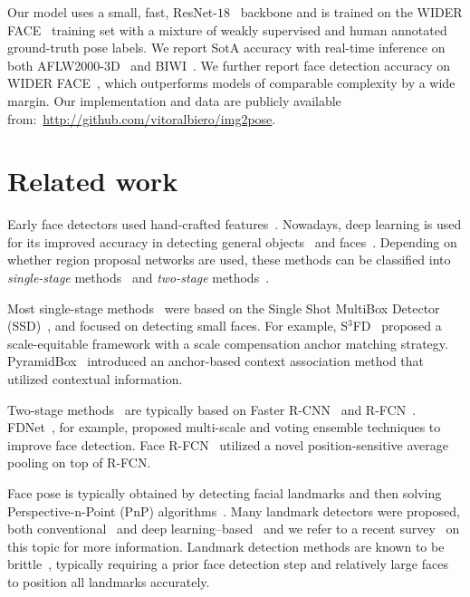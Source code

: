 \documentclass[final]{cvpr}
\newcommand{\minisection}[1]{\vspace{1mm}\noindent{\textbf{#1}.}}
\begin{document}
Our model uses a small, fast, ResNet-$18$~\cite{resnet} backbone and is trained on the WIDER FACE~\cite{wider_face} training set with a mixture of weakly supervised and human annotated ground-truth pose labels.  We report SotA accuracy with real-time inference on both AFLW2000-3D~\cite{3ddfa} and BIWI~\cite{biwi}. We further report face detection accuracy on WIDER FACE~\cite{wider_face}, which outperforms models of comparable complexity by a wide margin. Our implementation and data are publicly available from:~\url{http://github.com/vitoralbiero/img2pose}.


\section{Related work}
 Early face detectors used hand-crafted features~\cite{HOG, edgeori, haar}. Nowadays, deep learning is used for its improved accuracy in detecting general objects~\cite{faster_rcnn} and faces~\cite{retinaface, asfd}. Depending on whether region proposal networks are used, these methods can be classified into {\em single-stage} methods~\cite{ssd, redmon2016yolo9000, yolov3} and {\em two-stage} methods~\cite{faster_rcnn}.


Most single-stage methods~\cite{dsfd, ssh, pyramidbox, s3fd} were based on the Single Shot MultiBox Detector (SSD)~\cite{ssd}, and focused on detecting small faces. For example, S$^3$FD~\cite{s3fd} proposed a scale-equitable framework with a scale compensation anchor matching strategy. PyramidBox~\cite{pyramidbox} introduced an anchor-based context association method that utilized contextual information. 


Two-stage methods~\cite{facerfcn, fdnet} are typically based on Faster R-CNN~\cite{faster_rcnn} and R-FCN~\cite{rfcn}. FDNet~\cite{fdnet}, for example, proposed multi-scale and voting ensemble techniques to improve face detection. Face R-FCN~\cite{facerfcn} utilized a novel position-sensitive average pooling on top of R-FCN. 




\minisection{Face alignment and pose estimation}
Face pose is typically obtained by detecting facial landmarks and then solving Perspective-n-Point (PnP) algorithms~\cite{posit, epnp}. Many landmark detectors were proposed, both conventional~\cite{burgos2013robust, cao2014face, cootes1998active, liu2007generic} and deep learning--based~\cite{bulat2017far, sun2013deep, wu2017facial, zhu2012face} and we refer to a recent survey~\cite{landmark_survey} on this topic for more information. Landmark detection methods are known to be brittle~\cite{chang2019deep, faceposenet}, typically requiring a prior face detection step and relatively large faces to position all landmarks accurately.  
\end{document}
